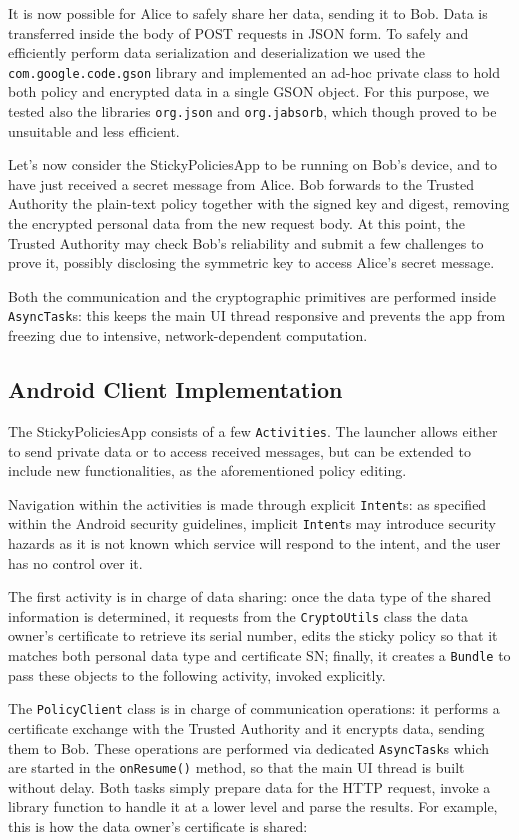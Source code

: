It is now possible for Alice to safely share her data, sending it to Bob. Data is transferred inside the body of POST requests in JSON form. To safely and efficiently perform data serialization and deserialization we used the \texttt{com.google.code.gson} library and implemented an ad-hoc private class to hold both policy and encrypted data in a single GSON object. For this purpose, we tested also the libraries \texttt{org.json} and \texttt{org.jabsorb}, which though proved to be unsuitable and less efficient.

Let's now consider the StickyPoliciesApp to be running on Bob's device, and to have just received a secret message from Alice. Bob forwards to the Trusted Authority the plain-text policy together with the signed key and digest, removing the encrypted personal data from the new request body. At this point, the Trusted Authority may check Bob's reliability and submit a few challenges to prove it, possibly disclosing the symmetric key to access Alice's secret message.

Both the communication and the cryptographic primitives are performed inside \texttt{AsyncTask}s: this keeps the main UI thread responsive and prevents the app from freezing due to intensive, network-dependent computation.

\subsection{Android Client Implementation}
The StickyPoliciesApp consists of a few \texttt{Activities}. The launcher allows either to send private data or to access received messages, but can be extended to include new functionalities, as the aforementioned policy editing.

Navigation within the activities is made through explicit \texttt{Intent}s: as specified within the Android security guidelines, implicit \texttt{Intent}s may introduce security hazards as it is not known which service will respond to the intent, and the user has no control over it.

The first activity is in charge of data sharing: once the data type of the shared information is determined, it requests from the \texttt{CryptoUtils} class the data owner's certificate to retrieve its serial number, edits the sticky policy so that it matches both personal data type and certificate SN; finally, it creates a \texttt{Bundle} to pass these objects to the following activity, invoked explicitly.

The \texttt{PolicyClient} class is in charge of communication operations: it performs a certificate exchange with the Trusted Authority and it encrypts data, sending them to Bob. These operations are performed via dedicated \texttt{AsyncTask}s which are started in the \texttt{onResume()} method, so that the main UI thread is built without delay. Both tasks simply prepare data for the HTTP request, invoke a library function to handle it at a lower level and parse the results. For example, this is how the data owner's certificate is shared:



